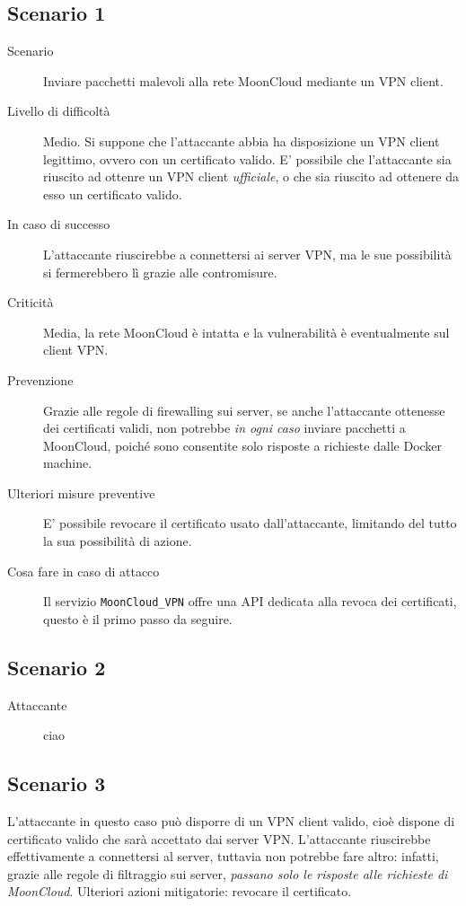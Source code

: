 \subsection{Scenario 1}
\begin{description}
    \item[Scenario]Inviare pacchetti malevoli alla rete MoonCloud
    mediante un VPN client.
    \item[Livello di difficoltà]Medio. Si suppone che l'attaccante abbia
    ha disposizione un VPN client legittimo, ovvero con un certificato
    valido. E' possibile che l'attaccante sia riuscito ad ottenre un
    VPN client \textit{ufficiale}, o che sia riuscito ad ottenere
    da esso
    un certificato valido.
    \item[In caso di successo]L'attaccante riuscirebbe a connettersi
    ai server VPN, ma le sue possibilità si fermerebbero lì grazie
    alle contromisure.
    \item[Criticità]Media, la rete MoonCloud è intatta e la vulnerabilità
    è eventualmente sul client VPN.
    \item[Prevenzione]Grazie alle regole di firewalling sui server,
    se anche l'attaccante ottenesse dei certificati validi, non
    potrebbe \textit{in ogni caso} inviare pacchetti a MoonCloud, poiché
    sono consentite solo risposte a richieste dalle Docker machine. 
    \item[Ulteriori misure preventive]E' possibile revocare il certificato
    usato dall'attaccante, limitando del tutto la sua possibilità di azione.
    \item[Cosa fare in caso di attacco]Il servizio  \texttt{MoonCloud\_VPN}
    offre una API dedicata alla revoca dei certificati, questo è il primo
    passo da seguire.
\end{description}

\subsection{Scenario 2}
\begin{description}
    \item[Attaccante]ciao
\end{description}

\subsection{Scenario 3}
L'attaccante in questo caso può disporre di un VPN client valido,
cioè dispone di certificato valido che sarà accettato dai server
VPN.
L'attaccante riuscirebbe effettivamente a connettersi al server,
tuttavia non potrebbe fare altro: infatti, grazie alle regole
di filtraggio sui server, \textit{passano solo le risposte
alle richieste di MoonCloud}.
Ulteriori azioni mitigatorie: revocare il certificato.


